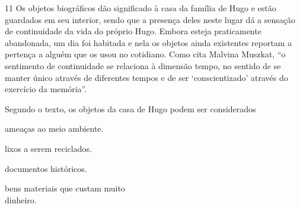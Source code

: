%

\num{11} Os objetos biográficos dão significado à casa da família de Hugo e
estão guardados em seu interior, sendo que a presença deles neste lugar
dá a sensação de continuidade da vida do próprio Hugo. Embora esteja
praticamente abandonada, um dia foi habitada e nela os objetos ainda
existentes reportam a pertença a alguém que os usou no cotidiano. Como
cita Malvina Muszkat, “o sentimento de continuidade se relaciona à
dimensão tempo, no sentido de se manter único através de diferentes
tempos e de ser `conscientizado' através do exercício da memória”.


\pagebreak
Segundo o texto, os objetos da casa de Hugo podem ser considerados

\begin{minipage}{.5\textwidth}
\begin{escolha}
\item ameaças ao meio ambiente.

\item lixos a serem reciclados.

\item documentos históricos.

\item bens materiais que custam muito\\ dinheiro.
\end{escolha}
\end{minipage}

